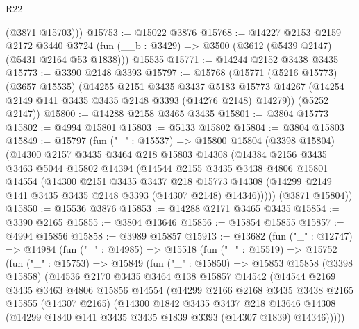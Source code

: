 \begin{lexlean}{R22}
\begin{coremodule}
        (@3871 @15703)))
@15753 := @15022 @3876
@15768 := @14227
    @2153
    @2159
    @2172
    @3440
    @3724
    (fun (__b : @3429) => @3500 (@3612 (@5439 @2147) (@5431 @2164 @53 @1838)))
    @15535
@15771 := @14244 @2152 @3438 @3435
@15773 := @3390 @2148 @3393
@15797 := @15768
    (@15771
      (@5216 @15773)
      (@3657 @15535)
      (@14255
        @2151
        @3435
        @3437
        @5183
        @15773
        @14267
        (@14254 @2149 @141 @3435 @3435 @2148 @3393 (@14276 @2148) @14279))
      (@5252 @2147))
@15800 := @14288 @2158 @3465 @3435
@15801 := @3804 @15773
@15802 := @4994 @15801
@15803 := @5133 @15802
@15804 := @3804 @15803
@15849 := @15797
    (fun ("_" : @15537) =>
    @15800
      @15804
      (@3398 @15804)
      (@14300
        @2157
        @3435
        @3464
        @218
        @15803
        @14308
        (@14384
          @2156
          @3435
          @3463
          @5044
          @15802
          @14394
          (@14544
            @2155
            @3435
            @3438
            @4806
            @15801
            @14554
            (@14300
              @2151
              @3435
              @3437
              @218
              @15773
              @14308
              (@14299 @2149 @141 @3435 @3435 @2148 @3393 (@14307 @2148) @14346)))))
      (@3871 @15804))
@15850 := @15536 @3876
@15853 := @14288 @2171 @3465 @3435
@15854 := @3390 @2165
@15855 := @3804 @13646
@15856 := @15854 @15855
@15857 := @4994 @15856
@15858 := @3989 @15857
@15913 := @13682
    (fun ("_" : @12747) =>
    @14984
      (fun ("_" : @14985) =>
      @15518
        (fun ("_" : @15519) =>
        @15752
          (fun ("_" : @15753) =>
          @15849
            (fun ("_" : @15850) =>
            @15853
              @15858
              (@3398 @15858)
              (@14536
                @2170
                @3435
                @3464
                @138
                @15857
                @14542
                (@14544
                  @2169
                  @3435
                  @3463
                  @4806
                  @15856
                  @14554
                  (@14299
                    @2166
                    @2168
                    @3435
                    @3438
                    @2165
                    @15855
                    (@14307 @2165)
                    (@14300
                      @1842
                      @3435
                      @3437
                      @218
                      @13646
                      @14308
                      (@14299 @1840 @141 @3435 @3435 @1839 @3393 (@14307 @1839) @14346)))))

\end{coremodule}
\end{lexlean}
